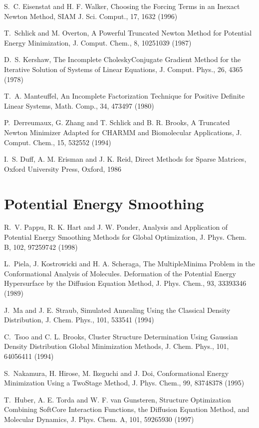 \documentclass[letterpaper,11pt,english]{sphinxmanual}
\begin{document}
S. C. Eisenstat and H. F. Walker, Choosing the Forcing Terms in an Inexact Newton Method, SIAM J. Sci. Comput., 17, 16\sphinxhyphen{}32 (1996)

T. Schlick and M. Overton, A Powerful Truncated Newton Method for Potential Energy Minimization, J. Comput. Chem., 8, 1025\sphinxhyphen{}1039 (1987)

D. S. Kershaw, The Incomplete Cholesky\sphinxhyphen{}Conjugate Gradient Method for the Iterative Solution of Systems of Linear Equations, J. Comput. Phys., 26, 43\sphinxhyphen{}65 (1978)

T. A. Manteuffel, An Incomplete Factorization Technique for Positive Definite Linear Systems, Math. Comp., 34, 473\sphinxhyphen{}497 (1980)

P. Derreumaux, G. Zhang and T. Schlick and B. R. Brooks, A Truncated Newton Minimizer Adapted for CHARMM and Biomolecular Applications, J. Comput. Chem., 15, 532\sphinxhyphen{}552 (1994)

I. S. Duff, A. M. Erisman and J. K. Reid, Direct Methods for Sparse Matrices, Oxford University Press, Oxford, 1986


\section{Potential Energy Smoothing}
\label{\detokenize{text/references:potential-energy-smoothing}}
R. V. Pappu, R. K. Hart and J. W. Ponder, Analysis and Application of Potential Energy Smoothing Methods for Global Optimization, J. Phys. Chem. B, 102, 9725\sphinxhyphen{}9742 (1998)

L. Piela, J. Kostrowicki and H. A. Scheraga, The Multiple\sphinxhyphen{}Minima Problem in the Conformational Analysis of Molecules. Deformation of the Potential Energy Hypersurface by the Diffusion Equation Method, J. Phys. Chem., 93, 3339\sphinxhyphen{}3346 (1989)

J. Ma and J. E. Straub, Simulated Annealing Using the Classical Density Distribution, J. Chem. Phys., 101, 533\sphinxhyphen{}541 (1994)

C. Tsoo and C. L. Brooks, Cluster Structure Determination Using Gaussian Density Distribution Global Minimization Methods, J. Chem. Phys., 101, 6405\sphinxhyphen{}6411 (1994)

S. Nakamura, H. Hirose, M. Ikeguchi and J. Doi, Conformational Energy Minimization Using a Two\sphinxhyphen{}Stage Method, J. Phys. Chem., 99, 8374\sphinxhyphen{}8378 (1995)

T. Huber, A. E. Torda and W. F. van Gunsteren, Structure Optimization Combining Soft\sphinxhyphen{}Core Interaction Functions, the Diffusion Equation Method, and Molecular Dynamics, J. Phys. Chem. A, 101, 5926\sphinxhyphen{}5930 (1997)
\end{document}
